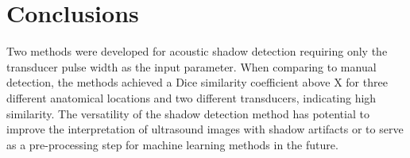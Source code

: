\documentclass[preprint,5p,authoryear]{elsarticle}
\begin{document}
\section*{Conclusions}
\label{Conclusions}
Two methods were developed for acoustic shadow detection requiring only the transducer pulse width as the input parameter. When comparing to manual detection, the methods achieved a Dice similarity coefficient above X for three different anatomical locations and two different transducers, indicating high similarity. The versatility of the shadow detection method has potential to improve the interpretation of ultrasound images with shadow artifacts or to serve as a pre-processing step for machine learning methods in the future.

        








\pagebreak




\end{document}
